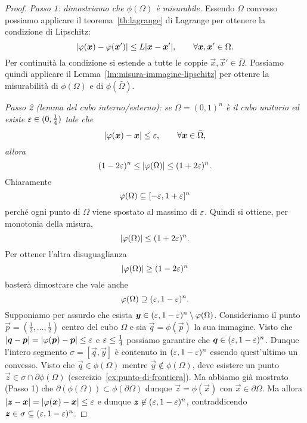 \begin{proof}
\emph{Passo 1: dimostriamo che $\phi(\Omega)$ è misurabile.}
Essendo $\Omega$ convesso possiamo applicare il teorema~\ref{th:lagrange} di Lagrange 
per ottenere la condizione di Lipschitz:
\[
{\left|\varphi(\boldsymbol x) - \varphi(\boldsymbol x')\right|} \le L {\left|\boldsymbol x - \boldsymbol x'\right|}, \qquad \forall \boldsymbol x,\boldsymbol x' \in \Omega.
\]
Per continuità la condizione si estende a tutte le coppie $\vec x, \vec x' \in \bar \Omega$.
Possiamo quindi applicare il Lemma~\ref{lm:misura-immagine-lipschitz} 
per ottenre la misurabilità di $\phi(\Omega)$ e di $\phi(\bar \Omega)$.

\emph{Passo 2 (lemma del cubo interno/esterno): 
se $\Omega = (0,1)^n$ è il cubo unitario  
ed esiste $\varepsilon\in(0,\frac 1 4)$ tale che 
\[
  {\left|\varphi(\boldsymbol x)-\boldsymbol x\right|} \le \varepsilon, \qquad \forall \boldsymbol x \in \bar \Omega,
\]
allora }
\[
  (1-2\varepsilon)^n
  \le {\left|\varphi(\Omega)\right|}
  \le (1+2\varepsilon)^n.
\]
Chiaramente 
\[
    \varphi(\Omega) \subseteq [-\varepsilon,1+\varepsilon]^n
\]
perché ogni punto di $\Omega$ viene spostato al massimo di $\varepsilon$. 
Quindi si ottiene, per monotonia della misura,
\[
    {\left|\varphi(\Omega)\right|} \le (1+2\varepsilon)^n.
\]
Per ottener l'altra disuguaglianza  
\[
   {\left|\varphi(\Omega)\right|} \ge (1-2\varepsilon)^n
\]
basterà dimostrare che vale anche 
\[
  \varphi(\Omega) \supseteq (\varepsilon,1-\varepsilon)^n.
\]
Supponiamo per assurdo che esista $\boldsymbol y \in (\varepsilon,1-\varepsilon)^n \setminus \varphi(\Omega)$.
Consideriamo il punto $\vec p=(\frac 12, \dots, \frac 12)$ centro 
del cubo $\Omega$ e sia $\vec q=\phi(\vec p)$ la sua immagine. 
Visto che ${\left|\boldsymbol q-\boldsymbol p\right|} = {\left|\varphi(\boldsymbol p)-\boldsymbol p\right|} \le \varepsilon$ 
e $\varepsilon \le \frac 1 4$ possiamo garantire che
$\boldsymbol q \in (\varepsilon,1-\varepsilon)^n$.
Dunque l'intero segmento $\sigma = [\vec q,\vec y]$ è contenuto 
in $(\varepsilon,1-\varepsilon)^n$ essendo quest'ultimo un convesso.
Visto che $\vec q\in \phi(\Omega)$ mentre $\vec y \notin \phi(\Omega)$,
deve esistere un punto $\vec z\in \sigma\cap \partial \phi(\Omega)$
(esercizio~\ref{ex:punto-di-frontiera}).
Ma abbiamo già mostrato (Passo 1) che $\partial (\phi(\Omega)) \subset \phi(\partial \Omega)$
dunque $\vec z=\phi(\vec x)$ con $\vec x \in \partial \Omega$. 
Ma allora ${\left|\boldsymbol z-\boldsymbol x\right|} = {\left|\varphi(\boldsymbol x)- \boldsymbol x\right|} \le \varepsilon$ 
e dunque $\boldsymbol z\not \in (\varepsilon,1-\varepsilon)^n$, 
contraddicendo $\boldsymbol z \in \sigma \subseteq (\varepsilon,1-\varepsilon)^n$.


\end{proof}
